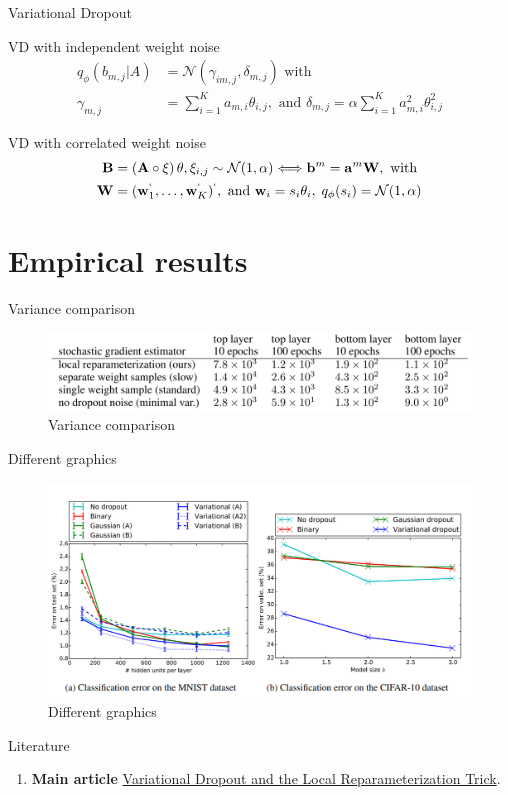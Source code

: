 \documentclass{beamer}
\newcommand{\bw}{\mathbf{w}}
\newcommand{\ba}{\mathbf{a}}
\newcommand{\bb}{\mathbf{b}}
\newcommand{\bW}{\mathbf{W}}
\newcommand{\bA}{\mathbf{A}}
\newcommand{\bB}{\mathbf{B}}
\begin{document}
\begin{frame}{Variational Dropout}
	\begin{block}{VD with independent weight noise}
		\begin{align*}
			q_\phi(b_{m, j} | A) &= \mathcal{N}(\gamma_{im, j}, \delta_{m, j}) \text{ with } \\
			\gamma_{m, j} &= \sum\limits_{i=1}^{K} a_{m, i} \theta_{i, j}, \text{ and } \delta_{m, j} = \alpha \sum\limits_{i=1}^{K} a_{m, i}^2 \theta_{i, j}^2
		\end{align*}
	\end{block}
	
	\begin{block}{VD with correlated weight noise}
		\begin{align*}
			\bB &= (\bA \circ \xi) \, \theta, \xi_{i, j} \sim \mathcal{N}(1, \alpha) \Longleftrightarrow \bb^m = \ba^m \bW, \text{ with } \\
			\bW &= (\bw_1^`, \ldots, \bw_K^`)^`, \text{ and } \bw_i = s_i \theta_i, \;  q_\phi(s_i) = \mathcal{N}(1, \alpha)
		\end{align*}
	\end{block}
\end{frame}

\section{Empirical results}
\begin{frame}{Variance comparison}
    \begin{figure}[bhtp]
    	\includegraphics[width=\linewidth]{table.png}
    	\caption{Variance comparison}
    \end{figure}
\end{frame}

\begin{frame}{Different graphics}
	\begin{figure}[bhtp]
		\includegraphics[width=\linewidth]{exp-2.png}
		\caption{Different graphics}
	\end{figure}
\end{frame}


\begin{frame}{Literature}
    \begin{enumerate}
        \item \textbf{Main article} \href{https://arxiv.org/pdf/1506.02557.pdf}
        {Variational Dropout and the Local Reparameterization Trick}.
    \end{enumerate}
\end{frame}
\end{document}
